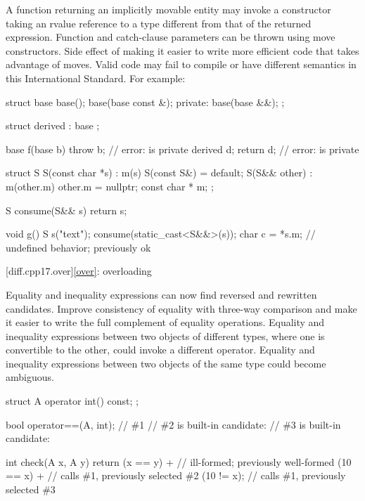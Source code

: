 \change
A function returning an implicitly movable entity
may invoke a constructor taking an rvalue reference to a type
different from that of the returned expression.
Function and catch-clause parameters can be thrown using move constructors.
\rationale
Side effect of making it easier to write
more efficient code that takes advantage of moves.
\effect
Valid \CppXVII{} code may fail to compile or have different semantics
in this International Standard.
For example:
\begin{codeblock}
struct base {
  base();
  base(base const &);
private:
  base(base &&);
};

struct derived : base {};

base f(base b) {
  throw b;                      // error:  is private
  derived d;
  return d;                     // error:  is private
}

struct S {
  S(const char *s) : m(s) { }
  S(const S&) = default;
  S(S&& other) : m(other.m) { other.m = nullptr; }
  const char * m;
};

S consume(S&& s) { return s; }

void g() {
  S s("text");
  consume(static_cast<S&&>(s));
  char c = *s.m;                // undefined behavior; previously ok
}
\end{codeblock}

[diff.cpp17.over]{\ref{over}: overloading}

\change
Equality and inequality expressions can now find
reversed and rewritten candidates.
\rationale
Improve consistency of equality with three-way comparison
and make it easier to write the full complement of equality operations.
\effect
Equality and inequality expressions between two objects of different types,
where one is convertible to the other,
could invoke a different operator.
Equality and inequality expressions between two objects of the same type
could become ambiguous.
\begin{codeblock}
struct A {
  operator int() const;
};

bool operator==(A, int);        // \#1
// \#2 is built-in candidate: 
// \#3 is built-in candidate: 

int check(A x, A y) {
  return (x == y) +             // ill-formed; previously well-formed
    (10 == x) +                 // calls \#1, previously selected \#2
    (10 != x);                  // calls \#1, previously selected \#3
}
\end{codeblock}

